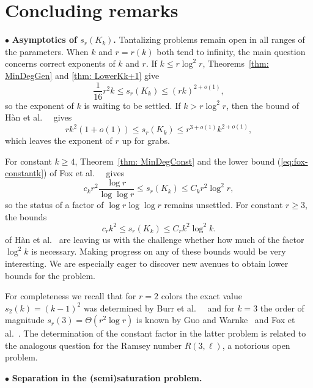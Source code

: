 \documentclass[12pt]{article}
\theoremstyle{definition}
\begin{document}
	\section{Concluding remarks} \label{sec:remarks}
	
	$\bullet$ {\bf Asymptotics of $s_r(K_{k})$.} 
	Tantalizing problems remain open in all ranges of the parameters. 
	When $k$ and $r=r(k)$ both tend to infinity, the main question concerns correct exponents of $k$ and $r$. 
	If $k\leq r \log^2 r$, Theorems~\ref{thm: MinDegGen} and \ref{thm: LowerKk+1} give 
	$$ \frac{1}{16}r^2 k \leq s_r(K_{k})  \leq (rk)^{2+o(1)},$$
	so the exponent of $k$ is waiting to be settled.
	If $k > r \log^2 r$, then the bound of H\`an et al.\ ~\cite{han} gives 
	$$r k^2(1+o(1)) \leq s_r(K_{k})  \leq r^{3+o(1)} k^{2+o(1)},$$
	which leaves the exponent of $r$ up for grabs.
	
	For constant $k\geq 4$, Theorem~\ref{thm: MinDegConst} and the lower bound (\ref{eq:fox-constantk}) of Fox et al.\ ~\cite{fox2016minimum} gives
	$$ c_k r^2 \frac{\log r}{\log\log r} \leq s_r(K_{k})  \leq C_k r^2 \log^2 r,$$
	so the status of a factor of $\log r \log \log r$ remains unsettled. 
	For constant $r\geq 3$, the bounds 
	$$ c_r k^2 \leq s_r(K_{k})  \leq C_rk^2 \log^2 k.$$ of H\`an et al.\ \cite{han} are leaving us with the challenge whether how much of the factor $\log^2 k$ is necessary. 
	Making progress on any of these bounds would be very interesting. 
	We are especially eager to discover new avenues to obtain lower bounds for the problem. 
	
	For completeness we recall that for $r=2$ colors the exact value $s_2(k)=(k-1)^2$ was determined by Burr et al.\ ~\cite{burr1976graphs} and for $k=3$ the order of magnitude $s_r(3) = \Theta (r^2\log r)$ is known by Guo and Warnke~\cite{guo2020packing} and Fox et al.\ \cite{fox2016minimum}. 
    The determination of the constant factor in the latter problem is related to the analogous question for the Ramsey number $R(3,\ell)$, a notorious open problem. 
	
	
	$\bullet$ {\bf Separation in the (semi)saturation problem.} 
\end{document}
